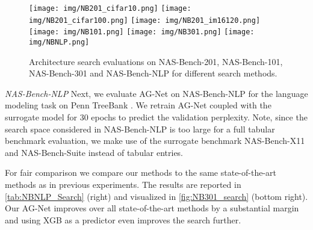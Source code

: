 \documentclass[runningheads]{llncs}
\begin{document}
\begin{figure*}[t]
    \centering
    \texttt{[image: img/NB201\_cifar10.png]}
    \texttt{[image: img/NB201\_cifar100.png]}
    \texttt{[image: img/NB201\_im16120.png]} \\
    \texttt{[image: img/NB101.png]}
    \texttt{[image: img/NB301.png]}
    \texttt{[image: img/NBNLP.png]}

    \caption{
    Architecture search evaluations on NAS-Bench-201, NAS-Bench-101, NAS-Bench-301 and NAS-Bench-NLP for different search methods.
    \label{fig:NB201_search} \label{fig:NB101_search} \label{fig:NB201_search} \label{fig:NB301_search}}
\end{figure*}

\noindent \textit{NAS-Bench-NLP}
Next, we evaluate AG-Net on NAS-Bench-NLP \cite{2020NBNLP} for the language modeling task on Penn TreeBank \cite{2010PTB}. We retrain AG-Net coupled with the surrogate model for 30 epochs to predict the validation perplexity. Note, since the search space considered in NAS-Bench-NLP is too large for a full tabular benchmark evaluation, we make use of the surrogate benchmark NAS-Bench-X11 \cite{2021NBX11} and NAS-Bench-Suite \cite{NBSuite} instead of tabular entries.

For fair comparison we compare our methods to the same state-of-the-art methods as in previous experiments. 
The results are reported in \autoref{tab:NBNLP_Search} (right) and visualized in \autoref{fig:NB301_search} (bottom right). Our AG-Net improves over all state-of-the-art methods by a substantial margin and using XGB as a predictor even improves the search further.
\end{document}
